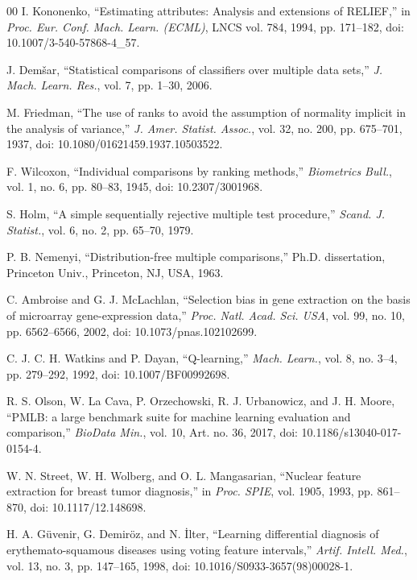 \documentclass[journal]{IEEEtran}
\begin{document}
\begin{thebibliography}{00}
 I. Kononenko, ``Estimating attributes: Analysis and extensions of RELIEF,'' in \textit{Proc. Eur. Conf. Mach. Learn. (ECML)}, LNCS vol. 784, 1994, pp. 171--182, doi: 10.1007/3-540-57868-4\_57.

 J. Dem\v{s}ar, ``Statistical comparisons of classifiers over multiple data sets,'' \textit{J. Mach. Learn. Res.}, vol. 7, pp. 1--30, 2006.

 M. Friedman, ``The use of ranks to avoid the assumption of normality implicit in the analysis of variance,'' \textit{J. Amer. Statist. Assoc.}, vol. 32, no. 200, pp. 675--701, 1937, doi: 10.1080/01621459.1937.10503522.

 F. Wilcoxon, ``Individual comparisons by ranking methods,'' \textit{Biometrics Bull.}, vol. 1, no. 6, pp. 80--83, 1945, doi: 10.2307/3001968.

 S. Holm, ``A simple sequentially rejective multiple test procedure,'' \textit{Scand. J. Statist.}, vol. 6, no. 2, pp. 65--70, 1979.

 P. B. Nemenyi, ``Distribution-free multiple comparisons,'' Ph.D. dissertation, Princeton Univ., Princeton, NJ, USA, 1963.

 C. Ambroise and G. J. McLachlan, ``Selection bias in gene extraction on the basis of microarray gene-expression data,'' \textit{Proc. Natl. Acad. Sci. USA}, vol. 99, no. 10, pp. 6562--6566, 2002, doi: 10.1073/pnas.102102699.


 C. J. C. H. Watkins and P. Dayan, ``Q-learning,'' \textit{Mach. Learn.}, vol. 8, no. 3--4, pp. 279--292, 1992, doi: 10.1007/BF00992698.

 R. S. Olson, W. La Cava, P. Orzechowski, R. J. Urbanowicz, and J. H. Moore, ``PMLB: a large benchmark suite for machine learning evaluation and comparison,'' \textit{BioData Min.}, vol. 10, Art. no. 36, 2017, doi: 10.1186/s13040-017-0154-4.

 W. N. Street, W. H. Wolberg, and O. L. Mangasarian, ``Nuclear feature extraction for breast tumor diagnosis,'' in \textit{Proc. SPIE}, vol. 1905, 1993, pp. 861--870, doi: 10.1117/12.148698.

 H. A. G\"uvenir, G. Demir\"oz, and N. \.Ilter, ``Learning differential diagnosis of erythemato-squamous diseases using voting feature intervals,'' \textit{Artif. Intell. Med.}, vol. 13, no. 3, pp. 147--165, 1998, doi: 10.1016/S0933-3657(98)00028-1.


\end{thebibliography}
\end{document}
